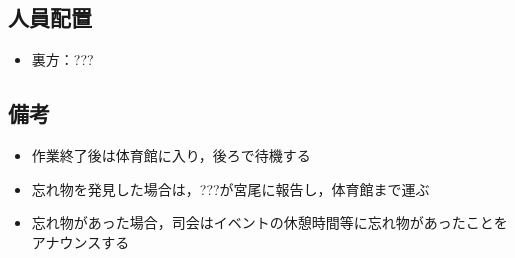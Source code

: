\subsection{人員配置}
\begin{itemize}
\item 裏方：???
\end{itemize}

\subsection{備考}
\begin{itemize}
  \item 作業終了後は体育館に入り，後ろで待機する
  \item 忘れ物を発見した場合は，???が宮尾に報告し，体育館まで運ぶ
  \item 忘れ物があった場合，司会はイベントの休憩時間等に忘れ物があったことをアナウンスする
\end{itemize}

%


